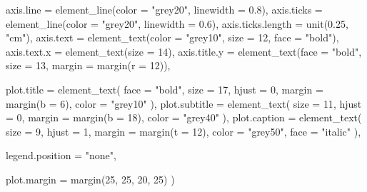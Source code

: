 \documentclass[
  letterpaper,
  DIV=11,
  numbers=noendperiod]{scrreprt}
\newenvironment{Shaded}{\begin{snugshade}}{\end{snugshade}}
\newcommand{\AttributeTok}[1]{\textcolor[rgb]{0.40,0.45,0.13}{#1}}
\newcommand{\DecValTok}[1]{\textcolor[rgb]{0.68,0.00,0.00}{#1}}
\newcommand{\FloatTok}[1]{\textcolor[rgb]{0.68,0.00,0.00}{#1}}
\newcommand{\FunctionTok}[1]{\textcolor[rgb]{0.28,0.35,0.67}{#1}}
\newcommand{\NormalTok}[1]{\textcolor[rgb]{0.00,0.23,0.31}{#1}}
\newcommand{\StringTok}[1]{\textcolor[rgb]{0.13,0.47,0.30}{#1}}
\begin{document}
\begin{Shaded}
\begin{Highlighting}[]
    \AttributeTok{axis.line =} \FunctionTok{element\_line}\NormalTok{(}\AttributeTok{color =} \StringTok{"grey20"}\NormalTok{, }\AttributeTok{linewidth =} \FloatTok{0.8}\NormalTok{),}
    \AttributeTok{axis.ticks =} \FunctionTok{element\_line}\NormalTok{(}\AttributeTok{color =} \StringTok{"grey20"}\NormalTok{, }\AttributeTok{linewidth =} \FloatTok{0.6}\NormalTok{),}
    \AttributeTok{axis.ticks.length =} \FunctionTok{unit}\NormalTok{(}\FloatTok{0.25}\NormalTok{, }\StringTok{"cm"}\NormalTok{),}
    \AttributeTok{axis.text =} \FunctionTok{element\_text}\NormalTok{(}\AttributeTok{color =} \StringTok{"grey10"}\NormalTok{, }\AttributeTok{size =} \DecValTok{12}\NormalTok{, }\AttributeTok{face =} \StringTok{"bold"}\NormalTok{),}
    \AttributeTok{axis.text.x =} \FunctionTok{element\_text}\NormalTok{(}\AttributeTok{size =} \DecValTok{14}\NormalTok{),}
    \AttributeTok{axis.title.y =} \FunctionTok{element\_text}\NormalTok{(}\AttributeTok{face =} \StringTok{"bold"}\NormalTok{, }\AttributeTok{size =} \DecValTok{13}\NormalTok{, }\AttributeTok{margin =} \FunctionTok{margin}\NormalTok{(}\AttributeTok{r =} \DecValTok{12}\NormalTok{)),}
    
    \AttributeTok{plot.title =} \FunctionTok{element\_text}\NormalTok{(}
      \AttributeTok{face =} \StringTok{"bold"}\NormalTok{,}
      \AttributeTok{size =} \DecValTok{17}\NormalTok{,}
      \AttributeTok{hjust =} \DecValTok{0}\NormalTok{,}
      \AttributeTok{margin =} \FunctionTok{margin}\NormalTok{(}\AttributeTok{b =} \DecValTok{6}\NormalTok{),}
      \AttributeTok{color =} \StringTok{"grey10"}
\NormalTok{    ),}
    \AttributeTok{plot.subtitle =} \FunctionTok{element\_text}\NormalTok{(}
      \AttributeTok{size =} \DecValTok{11}\NormalTok{,}
      \AttributeTok{hjust =} \DecValTok{0}\NormalTok{,}
      \AttributeTok{margin =} \FunctionTok{margin}\NormalTok{(}\AttributeTok{b =} \DecValTok{18}\NormalTok{),}
      \AttributeTok{color =} \StringTok{"grey40"}
\NormalTok{    ),}
    \AttributeTok{plot.caption =} \FunctionTok{element\_text}\NormalTok{(}
      \AttributeTok{size =} \DecValTok{9}\NormalTok{,}
      \AttributeTok{hjust =} \DecValTok{1}\NormalTok{,}
      \AttributeTok{margin =} \FunctionTok{margin}\NormalTok{(}\AttributeTok{t =} \DecValTok{12}\NormalTok{),}
      \AttributeTok{color =} \StringTok{"grey50"}\NormalTok{,}
      \AttributeTok{face =} \StringTok{"italic"}
\NormalTok{    ),}
    

    \AttributeTok{legend.position =} \StringTok{"none"}\NormalTok{,}
    

    \AttributeTok{plot.margin =} \FunctionTok{margin}\NormalTok{(}\DecValTok{25}\NormalTok{, }\DecValTok{25}\NormalTok{, }\DecValTok{20}\NormalTok{, }\DecValTok{25}\NormalTok{)}
\NormalTok{  )}
\end{Highlighting}
\end{Shaded}
\end{document}
